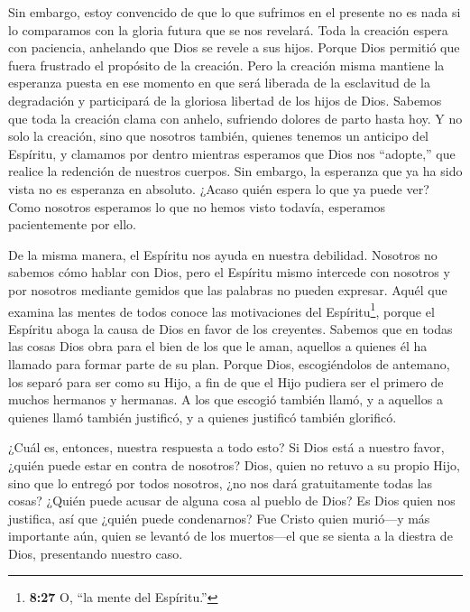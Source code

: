  Sin embargo, estoy convencido de que lo que sufrimos en el
presente no es nada si lo comparamos con la gloria futura que se nos
revelará.  Toda la creación espera con paciencia, anhelando
que Dios se revele a sus hijos.  Porque Dios permitió que
fuera frustrado el propósito de la creación.  Pero la
creación misma mantiene la esperanza puesta en ese momento en que será
liberada de la esclavitud de la degradación y participará de la gloriosa
libertad de los hijos de Dios.  Sabemos que toda la
creación clama con anhelo, sufriendo dolores de parto hasta hoy.
 Y no solo la creación, sino que nosotros también, quienes
tenemos un anticipo del Espíritu, y clamamos por dentro mientras
esperamos que Dios nos ``adopte,'' que realice la redención de nuestros
cuerpos.  Sin embargo, la esperanza que ya ha sido vista no
es esperanza en absoluto. ¿Acaso quién espera lo que ya puede ver?
 Como nosotros esperamos lo que no hemos visto todavía,
esperamos pacientemente por ello.

 De la misma manera, el Espíritu nos ayuda en nuestra
debilidad. Nosotros no sabemos cómo hablar con Dios, pero el Espíritu
mismo intercede con nosotros y por nosotros mediante gemidos que las
palabras no pueden expresar.  Aquél que examina las mentes
de todos conoce las motivaciones del Espíritu\footnote{\textbf{8:27} O,
  ``la mente del Espíritu.''}, porque el Espíritu aboga la causa de Dios
en favor de los creyentes.  Sabemos que en todas las cosas
Dios obra para el bien de los que le aman, aquellos a quienes él ha
llamado para formar parte de su plan.  Porque Dios,
escogiéndolos de antemano, los separó para ser como su Hijo, a fin de
que el Hijo pudiera ser el primero de muchos hermanos y hermanas.
 A los que escogió también llamó, y a aquellos a quienes
llamó también justificó, y a quienes justificó también glorificó.

 ¿Cuál es, entonces, nuestra respuesta a todo esto? Si Dios
está a nuestro favor, ¿quién puede estar en contra de nosotros?
 Dios, quien no retuvo a su propio Hijo, sino que lo
entregó por todos nosotros, ¿no nos dará gratuitamente todas las cosas?
 ¿Quién puede acusar de alguna cosa al pueblo de Dios? Es
Dios quien nos justifica,  así que ¿quién puede
condenarnos? Fue Cristo quien murió---y más importante aún, quien se
levantó de los muertos---el que se sienta a la diestra de Dios,
presentando nuestro caso.

